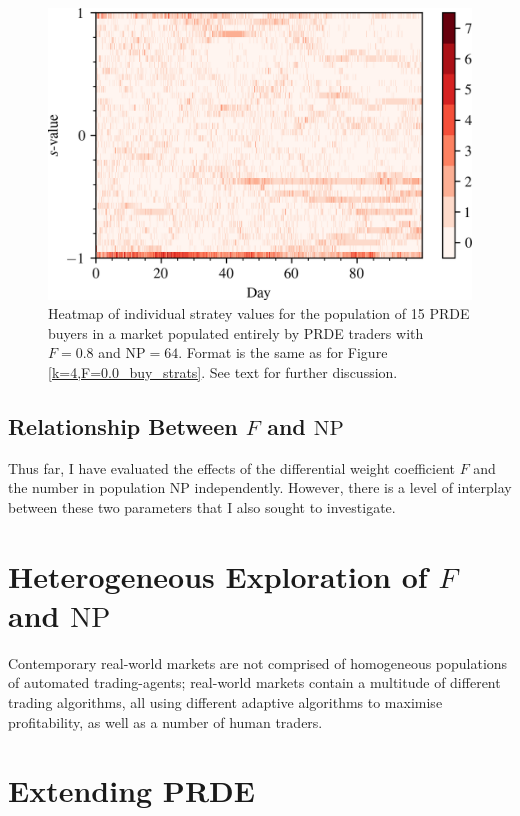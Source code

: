 \documentclass[conference]{IEEEtran}
\begin{document}
\begin{figure}[htbp]
    \centerline{\includegraphics[width=\columnwidth]{k=4,F=0.8_buy_strats.png}}
    \caption{
        Heatmap of individual stratey values for the population of 15 PRDE buyers in a market populated entirely by PRDE traders with $F=0.8$ and $\mathrm{NP}=64$.
        Format is the same as for Figure \ref{k=4,F=0.0_buy_strats}.
        See text for further discussion.
    }
    \label{k=4,F=0.8_buy_strats}
\end{figure}

\subsection{Relationship Between $F$ and $\mathrm{NP}$}

Thus far, I have evaluated the effects of the differential weight coefficient $F$ and the number in population $\mathrm{NP}$ independently.
However, there is a level of interplay between these two parameters that I also sought to investigate.

\section{Heterogeneous Exploration of $F$ and $\mathrm{NP}$}

Contemporary real-world markets are not comprised of homogeneous populations of automated trading-agents; real-world markets contain a multitude of different trading algorithms, all using different adaptive algorithms to maximise profitability, as well as a number of human traders.

\section{Extending PRDE}



\end{document}
